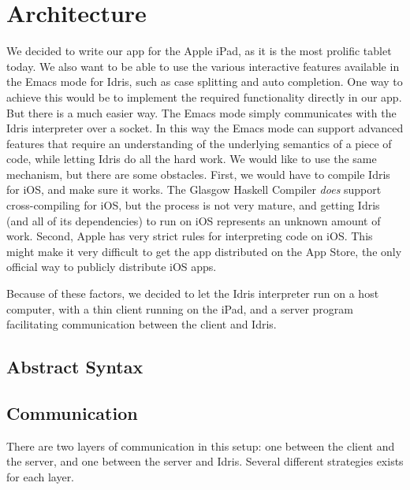 \section{Architecture}
\label{sec:Architecture}

We decided to write our app for the Apple iPad, as it is the most prolific
tablet today. We also want to be able to use the various interactive features
available in the Emacs mode for Idris, such as case
splitting and auto completion. One way to achieve this would be to implement
the required functionality directly in our app. But there is a much easier way.
The Emacs mode simply communicates with the Idris interpreter over a socket. 
In this way the Emacs mode can support advanced features that require an
understanding of the underlying semantics of a piece of code, while letting
Idris do all the hard work. We would like to use the same mechanism, but there
are some obstacles. First, we would have to compile Idris for iOS, and make 
sure it works. The Glasgow Haskell Compiler \emph{does} support 
cross-compiling for iOS, but the process is not very mature, and
getting Idris (and all of its dependencies) to run on iOS represents an 
unknown amount of work. Second, Apple has very strict rules for interpreting
code on iOS\@. This might make it very difficult to get the app distributed on
the App Store, the only official way to publicly distribute iOS apps.

Because of these factors, we decided to let the Idris interpreter run on a 
host computer, with a thin client running on the iPad, and a server program 
facilitating communication between the client and Idris.

\subsection{Abstract Syntax}
\label{subsec:AbstractSyntax}



\subsection{Communication}
There are two layers of communication in this setup: one between the client and
the server, and one between the server and Idris. Several different strategies
exists for each layer. 

